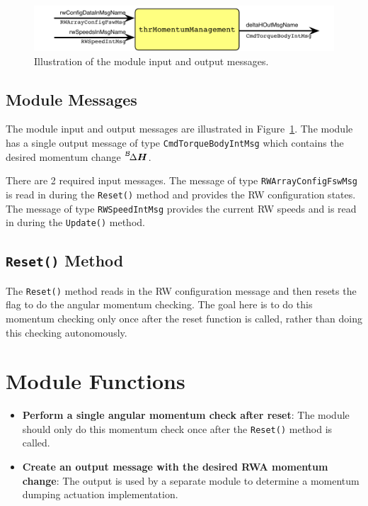 \documentclass[]{BasiliskReportMemo}
\begin{document}
\begin{figure}[h]
	\centerline{
		\includegraphics{Figures/moduleImg}
	}
	\caption{Illustration of the module input and output messages.}
	\label{fig:moduleImg}
\end{figure}





\subsection{Module Messages}
The module input and output messages are illustrated in Figure~\ref{fig:moduleImg}.  The module has a single output message of type {\tt CmdTorqueBodyIntMsg} which contains the desired momentum change $\leftexp{B}{\Delta}\bm H$.  

There are 2 required input messages.  The message of type {\tt RWArrayConfigFswMsg} is read in during the {\tt Reset()} method and provides the RW configuration states.  The message of type {\tt RWSpeedIntMsg} provides the current RW speeds and is read in during the {\tt Update()} method.

\subsection{{\tt Reset()} Method}
The {\tt Reset()} method reads in the RW configuration message and then resets the flag to do the angular momentum checking.  The goal here is to do this momentum checking only once after the reset function is called, rather than doing this checking autonomously.  









\section{Module Functions}
\begin{itemize}
	\item \textbf{Perform a single angular momentum check after reset}: The module should only do this momentum check once after the {\tt Reset()} method is called.
	\item \textbf{Create an output message with the desired RWA momentum change}: The output is used by a separate module to determine a momentum dumping actuation implementation.  
\end{itemize}
\end{document}
